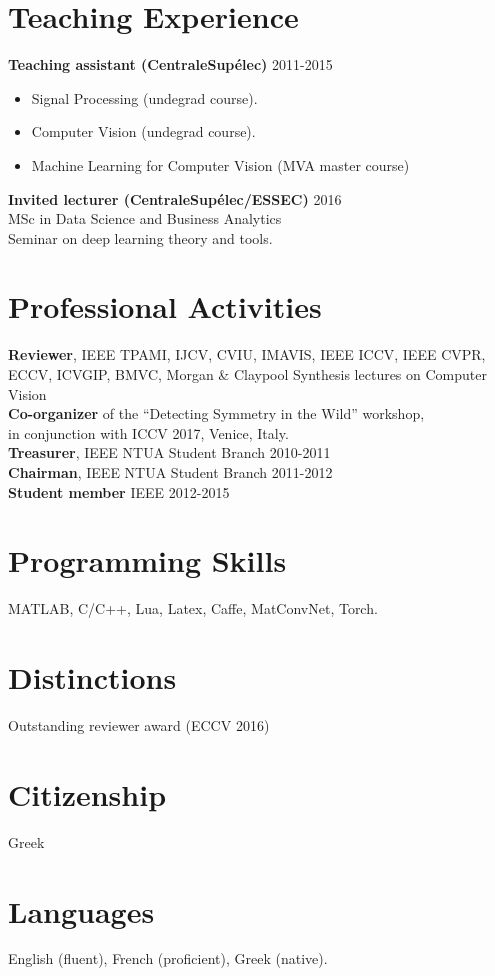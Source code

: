 \documentclass[margin]{res}
\begin{document}
\begin{resume}
\section{Teaching Experience} 
	\textbf{Teaching assistant (CentraleSup\'elec)}   \hfill 2011-2015 
	\begin{itemize}
		\item Signal Processing  (undegrad course).  
		\item Computer Vision  (undegrad course).
		\item Machine Learning for Computer Vision (MVA master course)
	\end{itemize}
	\textbf{Invited lecturer (CentraleSup\'elec/ESSEC)} \hfill 2016 \\
	MSc in Data Science and Business Analytics \\
	Seminar on deep learning theory and tools.


\section{Professional Activities} 
	\textbf{Reviewer}, IEEE TPAMI, IJCV, CVIU, IMAVIS, IEEE ICCV, IEEE CVPR, ECCV, 
	ICVGIP, BMVC, Morgan \& Claypool Synthesis lectures on Computer Vision \\
	\textbf{Co-organizer} of the ``Detecting Symmetry in the Wild'' workshop, \\
	in conjunction with ICCV 2017, Venice, Italy. \\
	\textbf{Treasurer}, IEEE NTUA Student Branch \hfill 2010-2011 \\
	\textbf{Chairman}, IEEE NTUA Student Branch \hfill 2011-2012 \\
	\textbf{Student member} IEEE \hfill 2012-2015

\section{Programming Skills} MATLAB, C/C++, Lua, Latex, Caffe, MatConvNet, Torch. 
\newline

\section{Distinctions} Outstanding reviewer award (ECCV 2016)
\section{Citizenship} Greek
\section{Languages} English (fluent), French (proficient), Greek (native).
 
\end{resume}
\end{document}
